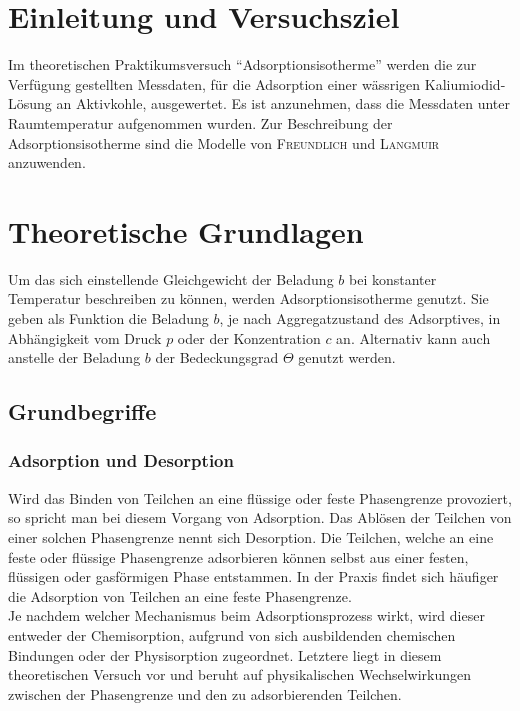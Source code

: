 \section{Einleitung und Versuchsziel}
\label{sec:aufgabenstellung}

Im theoretischen Praktikumsversuch "`Adsorptionsisotherme"' werden die zur Verfügung gestellten Messdaten, für die Adsorption einer wässrigen Kaliumiodid-Lösung   an Aktivkohle, ausgewertet. Es ist anzunehmen, dass die Messdaten unter Raumtemperatur aufgenommen wurden. Zur Beschreibung der Adsorptionsisotherme sind die Modelle von \textsc{Freundlich} und \textsc{Langmuir} anzuwenden.

\section*{Theoretische Grundlagen}
Um das sich einstellende Gleichgewicht der Beladung $b$ bei konstanter Temperatur beschreiben zu können, werden Adsorptionsisotherme genutzt. Sie geben als Funktion die Beladung $b$, je nach Aggregatzustand des Adsorptives, in Abhängigkeit vom Druck $p$ oder der Konzentration $c$ an. Alternativ kann auch anstelle der Beladung $b$ der Bedeckungsgrad $\Theta$ genutzt werden.

\subsection*{Grundbegriffe \cite{anleitung}}
\subsubsection*{Adsorption und Desorption}
Wird das Binden von Teilchen an eine flüssige oder feste Phasengrenze provoziert, so spricht man bei diesem Vorgang von Adsorption. Das Ablösen der Teilchen von einer solchen Phasengrenze nennt sich Desorption. Die Teilchen, welche an eine feste oder flüssige Phasengrenze adsorbieren können selbst aus einer festen, flüssigen oder gasförmigen Phase entstammen. In der Praxis findet sich häufiger die Adsorption von Teilchen an eine feste Phasengrenze.\\
Je nachdem welcher Mechanismus beim Adsorptionsprozess wirkt, wird dieser entweder der Chemisorption, aufgrund von sich ausbildenden chemischen Bindungen oder der Physisorption zugeordnet. Letztere liegt in diesem theoretischen Versuch vor und beruht auf physikalischen Wechselwirkungen zwischen der Phasengrenze und den zu adsorbierenden Teilchen.

